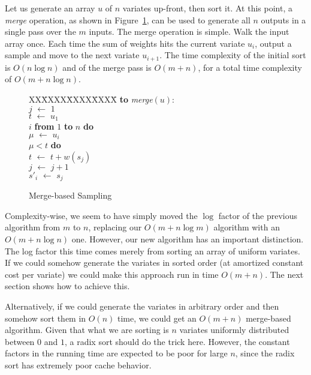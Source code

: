 \documentclass[12pt]{article}
\newcommand{\asgn}{\,\,\leftarrow\,\,}
\begin{document}
  Let us generate an array $u$ of $n$ variates up-front,
  then sort it.  At this point, a {\em merge} operation, as
  shown in Figure~\ref{fig-merge}, can be used to generate
  all $n$ outputs in a single pass over the $m$ inputs.  The
  merge operation is simple.  Walk the input array once.
  Each time the sum of weights hits the current variate
  $u_i$, output a sample and move to the next variate
  $u_{i+1}$.  The time complexity of the initial sort is
  $O(n \log n)$ and of the merge pass is $O(m + n)$, for a
  total time complexity of $O(m + n \log n)$.

  \begin{figure}
    \centering
    \begin{minipage}{0.6\textwidth}
      \begin{tabbing}
      XX\=XXXX\=XXXX\=XXXX\=\kill
      {\bf to} {\it merge}$(u)$: \\
      \>$j \asgn 1$ \\
      \>$t \asgn u_1$ \\
       $i$ {\bf from} $1$ {\bf to} $n$ {\bf do} \\
      \>\>$\mu \asgn u_i$ \\
      \> $\mu < t$ {\bf do} \\
      \>\>\>$t \asgn t + w(s_j)$ \\
      \>\>\>$j \asgn j + 1$ \\
      \>\>$s'_i \asgn s_j$
    \end{tabbing}
    \end{minipage}
    \caption{Merge-based Sampling}\label{fig-merge}
  \end{figure}

  Complexity-wise, we seem to have simply moved the $\log$
  factor of the previous algorithm from $m$ to $n$,
  replacing our $O(m + n \log m)$ algorithm with an $O(m + n
  \log n)$ one.  However, our new algorithm has an important
  distinction.  The log factor this time comes merely from
  sorting an array of uniform variates.  If we could somehow
  generate the variates in sorted order (at amortized
  constant cost per variate) we could make this approach run
  in time $O(m + n)$.  The next section shows how to achieve
  this.

  Alternatively, if we could generate the variates in
  arbitrary order and then somehow sort them in $O(n)$ time,
  we could get an $O(m + n)$ merge-based algorithm.  Given
  that what we are sorting is $n$ variates uniformly
  distributed between $0$ and $1$, a radix sort should do
  the trick here.  However, the constant factors in the
  running time are expected to be poor for large $n$, since
  the radix sort has extremely poor cache behavior.
\end{document}
